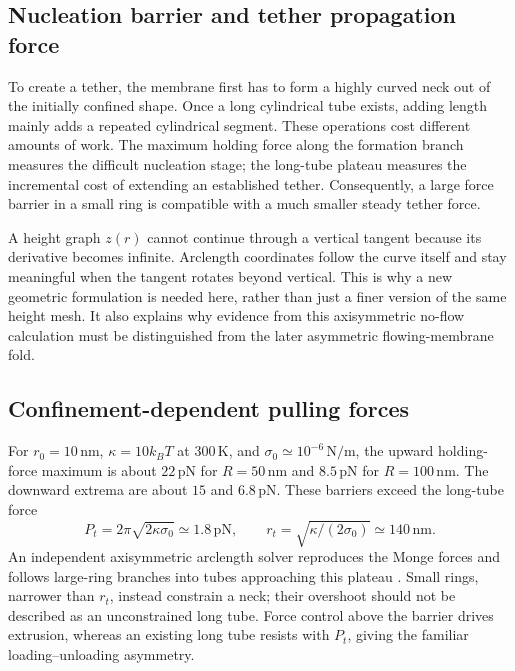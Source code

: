 \subsection{Nucleation barrier and tether propagation force}
To create a tether, the membrane first has to form a highly curved neck out of the initially confined shape. Once a long cylindrical tube exists, adding length mainly adds a repeated cylindrical segment. These operations cost different amounts of work. The maximum holding force along the formation branch measures the difficult nucleation stage; the long-tube plateau measures the incremental cost of extending an established tether. Consequently, a large force barrier in a small ring is compatible with a much smaller steady tether force.

A height graph $z(r)$ cannot continue through a vertical tangent because its derivative becomes infinite. Arclength coordinates follow the curve itself and stay meaningful when the tangent rotates beyond vertical. This is why a new geometric formulation is needed here, rather than just a finer version of the same height mesh. It also explains why evidence from this axisymmetric no-flow calculation must be distinguished from the later asymmetric flowing-membrane fold.


\subsection{Confinement-dependent pulling forces}


For $r_0=10\,\mathrm{nm}$, $\kappa=10k_BT$ at $300\,\mathrm K$, and $\sigma_0\simeq10^{-6}\,\mathrm{N/m}$, the upward holding-force maximum is about $22\,\mathrm{pN}$ for $R=50\,\mathrm{nm}$ and $8.5\,\mathrm{pN}$ for $R=100\,\mathrm{nm}$. The downward extrema are about $15$ and $6.8\,\mathrm{pN}$. These barriers exceed the long-tube force
\begin{equation}
P_t=2\pi\sqrt{2\kappa\sigma_0}\simeq1.8\,\mathrm{pN},\qquad r_t=\sqrt{\kappa/(2\sigma_0)}\simeq140\,\mathrm{nm}.\label{eq:tether}
\end{equation}
An independent axisymmetric arclength solver reproduces the Monge forces and follows large-ring branches into tubes approaching this plateau \cite{tethers}. Small rings, narrower than $r_t$, instead constrain a neck; their overshoot should not be described as an unconstrained long tube. Force control above the barrier drives extrusion, whereas an existing long tube resists with $P_t$, giving the familiar loading--unloading asymmetry.


